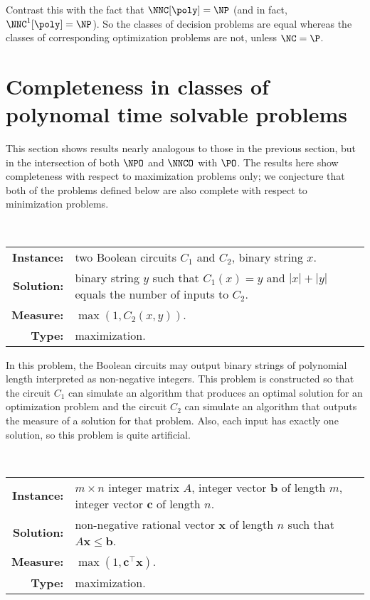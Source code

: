 Contrast this with the fact that $\NNC[\poly] = \NP$ \autocite[Theorem~2.2]{wolf94} (and in fact, $\NNC^1[\poly] = \NP$).
So the classes of decision problems are equal whereas the classes of corresponding optimization problems are not, unless $\NC = \P$.

\section{Completeness in classes of polynomal time solvable problems}

This section shows results nearly analogous to those in the previous section, but in the intersection of both $\NPO$ and $\NNCO$ with $\PO$.
The results here show completeness with respect to maximization problems only; we conjecture that both of the problems defined below are also complete with respect to minimization problems.

\begin{definition}
  \mbox{} \\
  \begin{tabular}{r p{9.5cm}}
    \textbf{Instance:} & two Boolean circuits $C_1$ and $C_2$, binary string $x$. \\
    \textbf{Solution:} & binary string $y$ such that $C_1(x) = y$ and $|x| + |y|$ equals the number of inputs to $C_2$. \\
    \textbf{Measure:} & $\max(1, C_2(x, y))$. \\
    \textbf{Type:} & maximization.
  \end{tabular}
\end{definition}

In this problem, the Boolean circuits may output binary strings of polynomial length interpreted as non-negative integers.
This problem is constructed so that the circuit $C_1$ can simulate an algorithm that produces an optimal solution for an optimization problem and the circuit $C_2$ can simulate an algorithm that outputs the measure of a solution for that problem.
Also, each input has exactly one solution, so this problem is quite artificial.

\begin{definition}
  \mbox{} \\
  \begin{tabular}{r p{9.5cm}}
    \textbf{Instance:} & $m \times n$ integer matrix $A$, integer vector $\mathbf{b}$ of length $m$, integer vector $\mathbf{c}$ of length $n$. \\
    \textbf{Solution:} & non-negative rational vector $\mathbf{x}$ of length $n$ such that $A \mathbf{x} \leq \mathbf{b}$. \\
    \textbf{Measure:} & $\max(1, \mathbf{c}^\intercal \mathbf{x})$. \\
    \textbf{Type:} & maximization.
  \end{tabular}
\end{definition}

